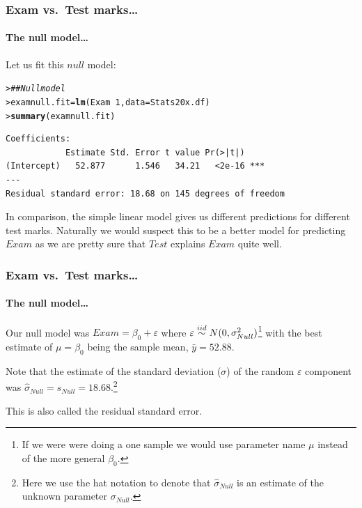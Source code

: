 \documentclass{beamer}\usepackage[]{graphicx}\usepackage[]{xcolor}
\makeatletter
\newcommand{\hlnum}[1]{\textcolor[rgb]{0.686,0.059,0.569}{#1}}%
\newcommand{\hlcom}[1]{\textcolor[rgb]{0.678,0.584,0.686}{\textit{#1}}}%
\newcommand{\hlopt}[1]{\textcolor[rgb]{0,0,0}{#1}}%
\newcommand{\hlstd}[1]{\textcolor[rgb]{0.345,0.345,0.345}{#1}}%
\newcommand{\hlkwb}[1]{\textcolor[rgb]{0.69,0.353,0.396}{#1}}%
\newcommand{\hlkwc}[1]{\textcolor[rgb]{0.333,0.667,0.333}{#1}}%
\newcommand{\hlkwd}[1]{\textcolor[rgb]{0.737,0.353,0.396}{\textbf{#1}}}%
\newenvironment{kframe}{%
 \def\at@end@of@kframe{}%
 \ifinner\ifhmode%
  \def\at@end@of@kframe{\end{minipage}}%
  \begin{minipage}{\columnwidth}%
 \fi\fi%
 \def\FrameCommand##1{\hskip\@totalleftmargin \hskip-\fboxsep
 \colorbox{shadecolor}{##1}\hskip-\fboxsep
     \hskip-\linewidth \hskip-\@totalleftmargin \hskip\columnwidth}%
 \MakeFramed {\advance\hsize-\width
   \@totalleftmargin\z@ \linewidth\hsize
   \@setminipage}}%
 {\par\unskip\endMakeFramed%
 \at@end@of@kframe}
\newenvironment{knitrout}{}{} %
\makeatother
\begin{document}
\begin{frame}[fragile]
\frametitle{Exam vs.\ Test marks\ldots}
\framesubtitle{The null model\ldots}
Let us fit this $null$ model:
\begin{knitrout}\scriptsize
{}\color{fgcolor}\begin{kframe}
\begin{alltt}
\hlstd{> }\hlcom{## Null model}
\hlstd{> }\hlstd{examnull.fit}\hlkwb{=}\hlkwd{lm}\hlstd{(Exam} \hlopt{~} \hlnum{1}\hlstd{,} \hlkwc{data} \hlstd{= Stats20x.df)}
\hlstd{> }\hlkwd{summary}\hlstd{(examnull.fit)}
\end{alltt}
\end{kframe}
\end{knitrout}
\begin{knitrout}\scriptsize
{}\color{fgcolor}\begin{kframe}
\begin{verbatim}
Coefficients:
            Estimate Std. Error t value Pr(>|t|)    
(Intercept)   52.877      1.546   34.21   <2e-16 ***
---
Residual standard error: 18.68 on 145 degrees of freedom
\end{verbatim}
\end{kframe}
\end{knitrout}

In comparison, the simple linear model 
gives us different predictions for different test marks. Naturally we would suspect this to be a better model for predicting $Exam$ as we are pretty sure that $Test$ explains $Exam$ quite well.

\end{frame}


\begin{frame}[fragile]
\frametitle{Exam vs.\ Test marks\ldots}
\framesubtitle{The null model\ldots}
Our null model was $Exam =\beta_0 +\varepsilon$ where $\varepsilon \stackrel{iid}{\sim} N(0, \sigma_{Null}^2)$\footnote {If we were were doing a one sample \ttest{} we would use parameter name $\mu$ instead of the more general $\beta_0$.} with the best estimate of $\mu=\beta_0$ being the
sample mean, $\bar{y}=52.88$.

\medskip
Note that the estimate of the standard deviation ($\sigma$) of the random $\varepsilon$ component  was $\hat{\sigma}_{Null}=s_{Null}=18.68$.\footnote{Here we use the hat notation to denote that $\hat{\sigma}_{Null}$ is an estimate of the unknown parameter $\sigma_{Null}$. }

This is also called the residual standard error.

\end{frame}
\end{document}
